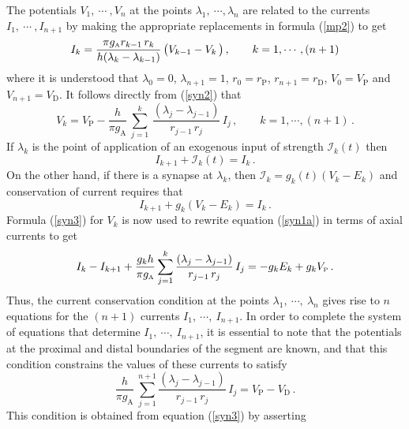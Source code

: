 The potentials $V_1,\ \cdots\ ,V_n$ at the points $\lambda_1,\
\cdots, \lambda_n$ are related to the currents $I_1,\ \cdots\ ,
I_{n+1}$ by making the appropriate replacements in formula
(\ref{mp2}) to get
\begin{equation}\label{syn2}
I_k = \displaystyle\frac{\pi g_{\mbox{\tiny A}}r_{k-1}\,r_k}
{h(\lambda_k-\lambda_{k-1})}\,\big(V_{k-1}-V_k\,\big)\,,\qquad
k=1,\cdots,(n+1)
\end{equation}
where it is understood that $\lambda_0=0$, $\lambda_{n+1}=1$,
$r_0=r_\mathrm{P}$, $r_{n+1}=r_\mathrm{D}$, $V_0=V_\mathrm{P}$ and
$V_{n+1}=V_\mathrm{D}$. It follows directly from (\ref{syn2}) that
\begin{equation}\label{syn3}
V_k = V_\mathrm{P} -\frac{h}{\pi g_\mathrm{A}}\,\sum_{j=1}^k \,
\frac{(\lambda_j-\lambda_{j-1})}{r_{j-1}\,r_j}\,I_j \,,\qquad
k=1,\cdots,(n+1)\,.
\end{equation}
If $\lambda_k$ is the point of application of an exogenous input
of strength $\mathcal{I}_k(t)$ then
\begin{equation}\label{syn1b}
I_{k+1}+\mathcal{I}_k(t) = I_k\,.
\end{equation}
On the other hand, if there is a synapse at $\lambda_k$, then
$\mathcal{I}_k=g_k(t)(V_k-E_k)$ and conservation of current
requires that
\begin{equation}\label{syn1a}
I_{k+1}+g_k(V_k-E_k) = I_k\,.
\end{equation}
Formula (\ref{syn3}) for $V_k$ is now used to rewrite equation
(\ref{syn1a}) in terms of axial currents to get
\begin{equation}\label{syn4}
I_k-I_{k+1}+\displaystyle\frac{g_k h}{\pi g_{\mbox{\tiny A}}}\sum_{j=1}^k
\frac{(\lambda_j-\lambda_{j-1})}{r_{j-1}\,r_j}\,I_j =
-g_kE_k+g_kV_{\mbox{\tiny P}}\,.
\end{equation}
Thus, the current conservation condition at the points
$\lambda_1,\ \cdots,\ \lambda_n$ gives rise to $n$ equations for
the $(n+1)$ currents $I_1,\ \cdots,\ I_{n+1}$. In order to
complete the system of equations that determine $I_1,\ \cdots,\
I_{n+1}$, it is essential to note that the potentials at the
proximal and distal boundaries of the segment are known, and that
this condition constrains the values of these currents to satisfy
\begin{equation}\label{syn5}
\frac{h}{\pi g_\mathrm{A}}\,\sum_{j=1}^{n+1}
\frac{(\lambda_j-\lambda_{j-1})}{r_{j-1}\,r_j}\,I_j =
V_\mathrm{P}-V_\mathrm{D}\,.
\end{equation}
This condition is obtained from equation (\ref{syn3}) by asserting
